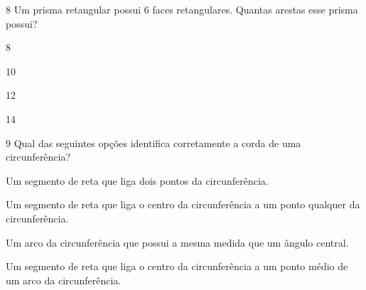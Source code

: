 \num{8} Um prisma retangular possui 6 faces retangulares. Quantas arestas
esse prisma possui?

\begin{multicols}{2}
\begin{escolha}
\item 8
\item 10
\item 12
\item 14
\end{escolha}
\end{multicols}







\pagebreak

\num{9} Qual das seguintes opções identifica corretamente a corda de uma
circunferência?

\begin{escolha}
\item Um segmento de reta que liga dois pontos da circunferência.
\item Um segmento de reta que liga o centro da circunferência a um ponto
qualquer da circunferência.
\item Um arco da circunferência que possui a mesma medida que um ângulo
central.
\item Um segmento de reta que liga o centro da circunferência a um ponto
médio de um arco da circunferência.
\end{escolha}

